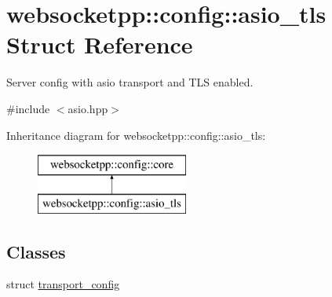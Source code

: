 \hypertarget{structwebsocketpp_1_1config_1_1asio__tls}{}\section{websocketpp\+:\+:config\+:\+:asio\+\_\+tls Struct Reference}
\label{structwebsocketpp_1_1config_1_1asio__tls}


Server config with asio transport and T\+L\+S enabled.  




{\ttfamily \#include $<$asio.\+hpp$>$}

Inheritance diagram for websocketpp\+:\+:config\+:\+:asio\+\_\+tls\+:\begin{figure}[H]
\begin{center}
\leavevmode
\includegraphics[height=2.000000cm]{structwebsocketpp_1_1config_1_1asio__tls}
\end{center}
\end{figure}
\subsection*{Classes}
\begin{DoxyCompactItemize}
\item 
struct \hyperlink{structwebsocketpp_1_1config_1_1asio__tls_1_1transport__config}{transport\+\_\+config}
\end{DoxyCompactItemize}
